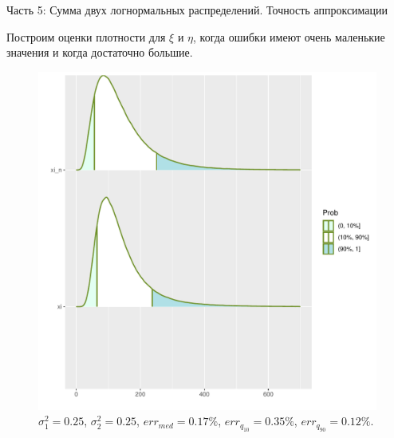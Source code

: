 \documentclass[ucs, notheorems, handout]{beamer}
\begin{document}
	\begin{frame}{Часть 5: Сумма двух логнормальных распределений. Точность аппроксимации}
		
		Построим оценки плотности для $\xi$ и $\eta$, когда ошибки имеют очень маленькие значения и когда достаточно большие.
		
		\begin{figure}[h]
			\begin{center}
				\begin{minipage}[h]{0.4\linewidth}
					\includegraphics[width=1\linewidth]{img/sr1.pdf}
					\caption{$\sigma_{1}^{2} = 0.25$, $\sigma_{2}^{2} = 0.25$, $err_{med} = 0.17\%$,  $err_{q_{10}} = 0.35\%$,  $err_{q_{90}} = 0.12\%$. } %
					\label{ris7} %
				\end{minipage}
				
			\end{center}
		\end{figure}
		
		
	\end{frame}
	
\end{document}
